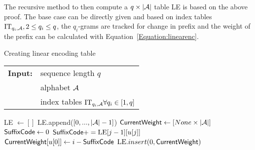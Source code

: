 The recursive method to then compute a \(q\times |\mathcal{A}|\) table LE is based on the above proof. The base case can be directly given and based on index tables \(\text{IT}_{q_i,\mathcal{A}},2 \leq q_i \leq q\), the \(q_i\)-grams are tracked for change in prefix and the weight of the prefix can be calculated with Equation~\ref{Equation:linearenc}.
\begin{algorithm}[t]
\caption{Creating linear encoding table}
\label{code:linearEncodingTable}
\begin{tabular}{@{}l@{~}l}
\textbf{Input:}&sequence length \(q\)\\
               &alphabet \(\mathcal{A}\)\\
               &index tables \(\text{IT}_{q_i,\mathcal{A}}\forall q_i \in [1,q]\)\\
\end{tabular}
\begin{algorithmic}
\State LE \(\gets []\)
\State LE.append(\([0,...,|\mathcal{A}|-1]\))
\State \(\mathsf{CurrentWeight} \gets [None \times |\mathcal{A}|]\)
\State \(\mathsf{SuffixCode}\gets 0\)
\State \(\mathsf{SuffixCode} += \text{LE}[j-1][u[j]]\)
\EndFor
\State \(\mathsf{CurrentWeight} [u[0]] \gets i - \mathsf{SuffixCode}\)
\EndIf
\EndFor
\State \(\text{LE}.insert(0,\mathsf{CurrentWeight})\)
\EndFor
\end{algorithmic}
\end{algorithm}

\begin{comment}
\begin{algorithm}[t]
\caption{Linear encoding of sorted \(q\)-grams}
\label{code:linearEncode}
\begin{tabular}{@{}l@{~}l}
\textbf{Input:}&sorted \(q\)-gram \(u\)\\
                &alphabet \(\Alpha\)\\
               &linear encoding table LE of size \(q\times|\Alpha|\)
\end{tabular}
\begin{algorithmic}
\State \(\text{Code} \gets 0\)
\For{\(i\in [0,q-1]\)}
\State \(\text{Code} += \text{LE}[i][u[i]]\)
\EndFor
\State return \(\text{Code}\)
\end{algorithmic}
\end{algorithm}    
\end{comment}
